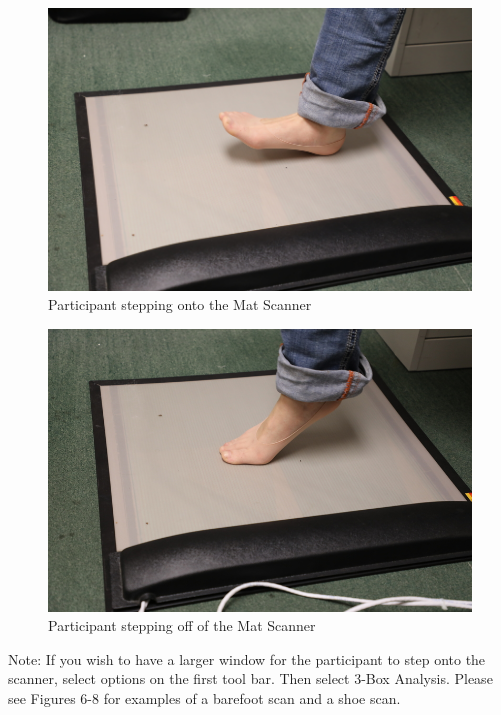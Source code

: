 \newpage

\begin{figure}[!htp]
\centering
\includegraphics[scale=0.28]{Mat_Step_1}
\caption{Participant stepping onto the Mat Scanner}
\label{Image 4}
\end{figure}


\begin{figure}[!htp]
\centering
\includegraphics[scale=0.3]{Mat_Step_2}
\caption{Participant stepping off of the Mat Scanner}
\label{Image 5}
\end{figure}

\newpage

Note: If you wish to have a larger window for the participant to step onto the scanner, select options on the first tool bar. Then select 3-Box Analysis.  Please see Figures 6-8 for examples of a barefoot scan and a shoe scan. 

